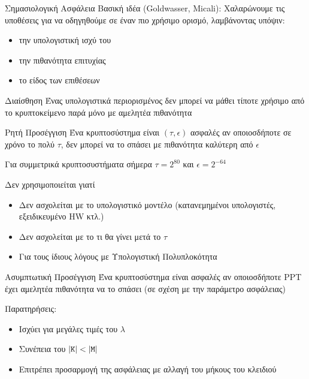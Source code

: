 \documentclass[handout]{beamer}
\begin{document}
\begin{frame}[allowframebreaks]{Σημασιολογική Ασφάλεια}
Βασική ιδέα (Goldwasser, Micali): Χαλαρώνουμε τις υποθέσεις για να οδηγηθούμε σε έναν πιο χρήσιμο ορισμό, λαμβάνοντας υπόψιν:

\begin{itemize}
	\item την υπολογιστική ισχύ του \adv
	\item την πιθανότητα επιτυχίας
	\item το είδος των επιθέσεων
\end{itemize}

\begin{block}{Διαίσθηση}
Ένας υπολογιστικά περιορισμένος \adv  δεν μπορεί να μάθει τίποτε χρήσιμο από το κρυπτοκείμενο παρά μόνο με αμελητέα πιθανότητα
\end{block}

\framebreak
\begin{block}{Ρητή Προσέγγιση}
Ένα κρυπτοσύστημα είναι $(\tau,\epsilon)$ ασφαλές αν οποιοσδήποτε \adv σε χρόνο το πολύ $\tau$, δεν μπορεί να το σπάσει με πιθανότητα καλύτερη από $\epsilon$ 
\end{block}
Για συμμετρικά κρυπτοσυστήματα σήμερα $\tau=2^{80}$ και $\epsilon=2^{-64}$

\alert{Δεν χρησιμοποιείται} γιατί

\begin{itemize}
\item Δεν ασχολείται με το υπολογιστικό μοντέλο (κατανεμημένοι υπολογιστές, εξειδικευμένο HW κτλ.)
\item Δεν ασχολείται με το τι θα γίνει μετά το $\tau$
\item Για τους ίδιους λόγους με Υπολογιστική Πολυπλοκότητα
\end{itemize}

\framebreak

\begin{block}{Ασυμπτωτική Προσέγγιση}
Ένα κρυπτοσύστημα είναι ασφαλές αν οποιοσδήποτε PPT \adv έχει αμελητέα πιθανότητα να το σπάσει (σε σχέση με την παράμετρο ασφάλειας)
\end{block}

Παρατηρήσεις:
\begin{itemize}
\item Ισχύει για μεγάλες τιμές του $\lambda$
\item Συνέπεια του $|\mathtt{K}| < |\mathtt{M}|$
\item Επιτρέπει προσαρμογή της ασφάλειας με αλλαγή του μήκους του κλειδιού
\end{itemize}
 

\end{frame}
\end{document}
